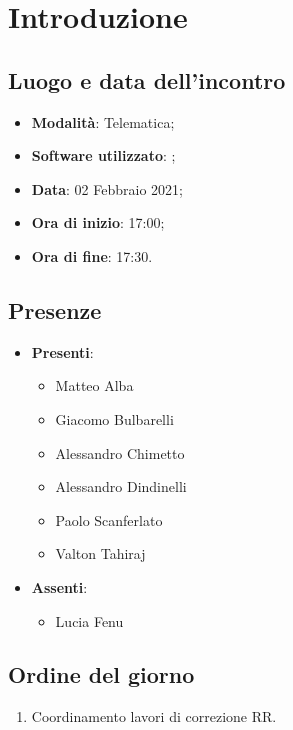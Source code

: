 \documentclass[]{article}
\begin{document}
	
	
	
	\newpage
	
	
		\section{Introduzione}
		\subsection{Luogo e data dell'incontro}
		\begin{itemize}
			\item \textbf{Modalità}: Telematica;
			\item \textbf{Software utilizzato}: ;
			\item \textbf{Data}: 02 Febbraio 2021;
			\item \textbf{Ora di inizio}: 17:00;
			\item \textbf{Ora di fine}: 17:30.
		\end{itemize}

		\subsection{Presenze}
		\begin{itemize}
			\item \textbf{Presenti}:
			\begin{itemize}
				\item Matteo Alba
				\item Giacomo Bulbarelli
				\item Alessandro Chimetto
				\item Alessandro Dindinelli
				\item Paolo Scanferlato
				\item Valton Tahiraj
			\end{itemize}
			\item \textbf{Assenti}:
			\begin{itemize}
				\item Lucia Fenu
			\end{itemize}
		\end{itemize}


		\subsection{Ordine del giorno}
		\begin{enumerate}
			\item Coordinamento lavori di correzione RR.
		\end{enumerate}
\end{document}
